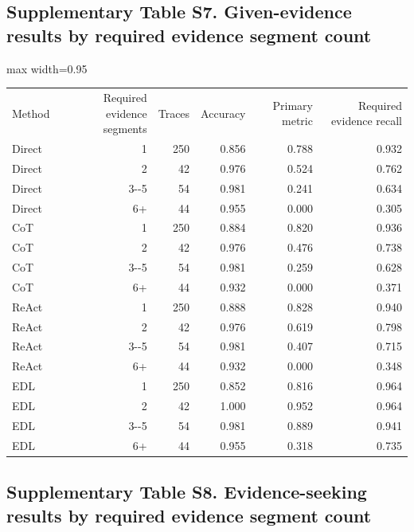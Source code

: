 \documentclass[
  8pt,
]{extarticle}
\begin{document}
\hypertarget{supplementary-table-s7-given-evidence-results-by-required-evidence-segment-count}{%
\subsection{Supplementary Table S7. Given-evidence results by required
evidence segment
count}\label{supplementary-table-s7-given-evidence-results-by-required-evidence-segment-count}}

\begin{center}
\begin{adjustbox}{max width=0.95\textwidth}
\begin{tabular}{@{}
lrrrrr@{}}
\toprule\noalign{}
Method & Required evidence segments & Traces & Accuracy & Primary metric
& Required evidence recall \\

Direct & 1 & 250 & 0.856 & 0.788 & 0.932 \\
Direct & 2 & 42 & 0.976 & 0.524 & 0.762 \\
Direct & 3-\/-5 & 54 & 0.981 & 0.241 & 0.634 \\
Direct & 6+ & 44 & 0.955 & 0.000 & 0.305 \\
CoT & 1 & 250 & 0.884 & 0.820 & 0.936 \\
CoT & 2 & 42 & 0.976 & 0.476 & 0.738 \\
CoT & 3-\/-5 & 54 & 0.981 & 0.259 & 0.628 \\
CoT & 6+ & 44 & 0.932 & 0.000 & 0.371 \\
ReAct & 1 & 250 & 0.888 & 0.828 & 0.940 \\
ReAct & 2 & 42 & 0.976 & 0.619 & 0.798 \\
ReAct & 3-\/-5 & 54 & 0.981 & 0.407 & 0.715 \\
ReAct & 6+ & 44 & 0.932 & 0.000 & 0.348 \\
EDL & 1 & 250 & 0.852 & 0.816 & 0.964 \\
EDL & 2 & 42 & 1.000 & 0.952 & 0.964 \\
EDL & 3-\/-5 & 54 & 0.981 & 0.889 & 0.941 \\
EDL & 6+ & 44 & 0.955 & 0.318 & 0.735 \\
\bottomrule
\end{tabular}
\end{adjustbox}
\end{center}

\hypertarget{supplementary-table-s8-evidence-seeking-results-by-required-evidence-segment-count}{%
\subsection{Supplementary Table S8. Evidence-seeking results by required
evidence segment
count}\label{supplementary-table-s8-evidence-seeking-results-by-required-evidence-segment-count}}
\end{document}

